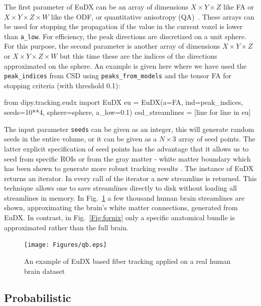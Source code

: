 \documentclass{bioinfo}
\begin{document}
The first parameter of EuDX can be an array of dimensions $X\times Y\times Z$
like FA or $X\times Y\times Z \times W$ like the ODF, or quantitative
anisotropy (QA)~\citep{yeh-etal:10}. These arrays can be used for stopping the
propagation if the value in the current voxel is lower than
\texttt{a\_low}. For efficiency, the peak directions are discretized on a unit
sphere. For this purpose, the second parameter is another array of dimensions
$X\times Y\times Z$ or $X\times Y\times Z\times W$ but this time these are the
indices of the directions approximated on the sphere. An example is given here
where we have used the \texttt{peak\_indices} from CSD using \texttt{peaks\_from\_models}
and the tensor FA for stopping criteria (with threshold 0.1):
\begin{python}
from dipy.tracking.eudx import EuDX
eu = EuDX(a=FA, ind=peak_indices, seeds=10**4,
          sphere=sphere, a_low=0.1)
csd_streamlines = [line for line in eu]
\end{python}
The input parameter \texttt{seeds} can be given as an integer, this will
generate random seeds in the entire volume, or it can be given as a $N\times 3$
array of seed points. The latter explicit specification of seed points has the
advantage that it allows us to seed from specific ROIs or from the gray matter
- white matter boundary which has been shown to generate more robust tracking
results \citep{Cote2013tractometer}. The instance of EuDX returns an
iterator. In every call of the iterator a new streamline is returned. This
technique allows one to save streamlines directly to disk without loading all
streamlines in memory. In Fig.~\ref{Fig:pretty_streamlines} a few thousand
human brain streamlines are shown, approximating the brain's white matter connections,
generated from EuDX. In contrast, in Fig.~\ref{Fig:fornix} only a specific anatomical bundle is
approximated rather than the full brain.

\begin{figure}[!htb]
\texttt{[image: Figures/qb.eps]}
\centering{}
\caption{An example of EuDX based fiber tracking applied on a real
  human brain dataset\label{Fig:pretty_streamlines}}
\end{figure}

\subsection{Probabilistic}
\end{document}
